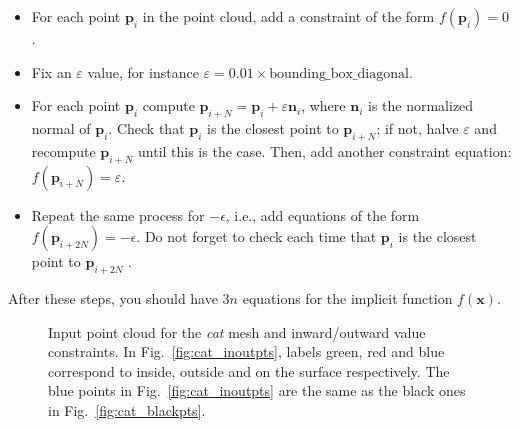 \documentclass[11pt]{amsart}
\renewcommand{\vec}[1]{\mathbf{#1}}
\def\x{\vec{x}}
\begin{document}
\begin{itemize}
\item For each point $\vec{p}_i$ in the point cloud, add a constraint of the form $f(\vec{p}_i) = 0$.
\item Fix an $\varepsilon$ value, for instance $\varepsilon = 0.01\times  \textrm{bounding\_box\_diagonal}$.
\item For each point $\vec{p}_i$ compute $\vec{p}_{i+N} = \vec{p}_i +
    \varepsilon \vec{n}_i$, where $\vec{n}_i$ is the normalized normal of
        $\vec{p}_i$. Check that $\vec{p}_i$ is the closest point to $\vec{p}_{i+N}$;
        if not, halve $\varepsilon$ and recompute $\vec{p}_{i+N}$ until
        this is the case. Then, add another constraint equation:
        $f (\vec{p}_{i+N} ) = \varepsilon$.
\item Repeat the same process for $-\epsilon$, i.e., add equations of the form
    $f(\vec{p}_{i+2N}) = -\epsilon$. Do not forget to check each time that $\vec{p}_i$ is the closest point to $\vec{p}_{i+2N}$ .
\end{itemize}
After these steps, you should have $3n$ equations for the implicit function
$f(\x)$.

\begin{figure}[h!]
   \centering
\hspace{1cm}
   \caption{Input point cloud for the \emph{cat} mesh and inward/outward value constraints. In Fig.~\ref{fig:cat_inoutpts}, labels green, red and blue correspond to inside, outside and on the surface respectively. The blue points in Fig.~\ref{fig:cat_inoutpts} are the same as the black ones in Fig.~\ref{fig:cat_blackpts}.}
   \label{fig:cat_ptcloud}
\end{figure}
\end{document}
